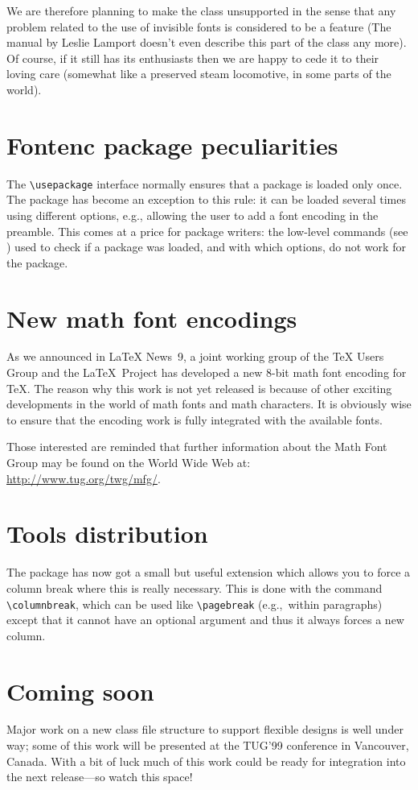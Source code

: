 \documentclass{ltnews}
\begin{document}
We are therefore planning to make the  class
unsupported in the sense that any problem related to the use of
invisible fonts is considered to be a feature (The \LaTeXe{} manual by
Leslie Lamport doesn't even describe this part of the class any more).
Of course, if it still has its enthusiasts then we are happy to cede
it to their loving care (somewhat like a preserved steam locomotive,
in some parts of the world).

\section{Fontenc package peculiarities}

The \verb=\usepackage= interface normally ensures that a package is
loaded only once.  The  package has become an
exception to this rule: it can be loaded several times using different
options, e.g., allowing the user to add a font encoding in the
preamble. This comes at a price for package writers: the low-level
commands (see ) used to check if a package was
loaded, and with which options, do not work for the 
package.

\section{New math font encodings}

As we announced in \LaTeX{} News~9, a joint working group of the
\TeX{} Users Group and the \LaTeX\ Project has developed a new
\mbox{8-bit} math font encoding for \TeX{}.
The reason why this work is not yet released is because of other
exciting developments in the world of math fonts and math characters.
It is obviously wise to ensure that the encoding work is fully
integrated with the available fonts.

Those interested are reminded that further information about the Math
Font Group may be found on the World Wide Web at:\\
\url{http://www.tug.org/twg/mfg/}.

\section{Tools distribution}

The  package has now got a small but useful extension
which allows you to force a column break where this is really
necessary.  This is done with the command \verb=\columnbreak=, which
can be used like \verb=\pagebreak= (e.g.,~within paragraphs) except
that it cannot have an optional argument and thus it always forces a
new column.

\section{Coming soon}

Major work on a new class file structure to support flexible
designs is well under way; some of this work will be presented at the
TUG'99 conference in Vancouver, Canada.  With a bit of luck much of
this work could be ready for integration into the next release---so
watch this space!
\end{document}
